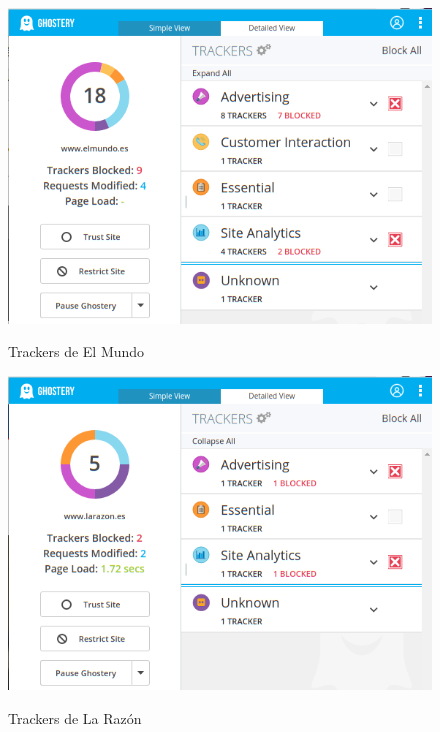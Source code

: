 \documentclass[10pt,a4paper]{article}
\begin{document}
\begin{figure}[H]
  \centering
  \includegraphics[scale=0.6]{ghost_elmundo.png}\\
  \caption{Trackers de El Mundo}
  \label{fig:object}
\end{figure}

\begin{figure}[H]
  \centering
  \includegraphics[scale=0.6]{ghost_razon.png}\\
  \caption{Trackers de La Razón}
  \label{fig:object}
\end{figure}
\end{document}
